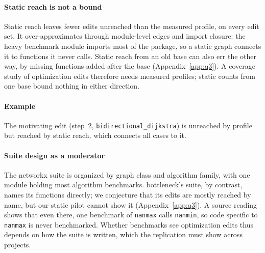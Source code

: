 
\paragraph*{Static reach is not a bound}
Static reach leaves fewer edits unreached than the measured profile, on every edit set.
It over-approximates through module-level edges and import closure: the heavy benchmark module imports most of the package, so a static graph connects it to functions it never calls.
Static reach from an old base can also err the other way, by missing functions added after the base (Appendix~\ref{app:q3}).
A coverage study of optimization edits therefore needs measured profiles; static counts from one base bound nothing in either direction.

\paragraph*{Example}
The motivating edit (step~2, \texttt{bidirectional\_dijkstra}) is unreached by profile but reached by static reach, which connects all \NxBenchCases{} cases to it.

\paragraph*{Suite design as a moderator}
The networkx suite is organized by graph class and algorithm family, with one module holding most algorithm benchmarks.
bottleneck's suite, by contrast, names its functions directly; we conjecture that its edits are mostly reached by name, but our static pilot cannot show it (Appendix~\ref{app:q3}). A source reading shows that even there, one benchmark of \texttt{nanmax} calls \texttt{nanmin}, so code specific to \texttt{nanmax} is never benchmarked.
Whether benchmarks see optimization edits thus depends on how the suite is written, which the replication must show across projects.

